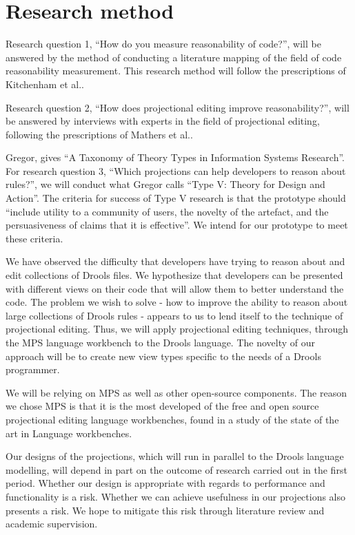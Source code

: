 \section{Research method} 

Research question 1, ``How do you measure reasonability of code?'', will be answered by the method of conducting a literature mapping of the field of code reasonability measurement. 
This research method will follow the prescriptions of Kitchenham et al.\cite{kitchenham2015evidence}.

Research question 2, ``How does projectional editing improve reasonability?'', will be answered by interviews with experts in the field of projectional editing, following the prescriptions of Mathers et al.\cite{mathers1998using}.

Gregor\cite{gregor2006nature}, gives ``A Taxonomy of Theory Types in Information Systems Research''. 
For research question 3, ``Which projections can help developers to reason about rules?'', we will conduct what Gregor calls ``Type V: Theory for Design and Action''. 
The criteria for success of Type V research is that the prototype should ``include utility to a community of users, the novelty of the artefact, and the persuasiveness of claims that it is effective''.
We intend for our prototype to meet these criteria.

We have observed the difficulty that developers have trying to reason about and edit collections of Drools files.
We hypothesize that developers can be presented with different views on their code that will allow them to better understand the code.
The problem we wish to solve - how to improve the ability to reason about large collections of Drools rules - appears to us to lend itself to the technique of projectional editing.
Thus, we will apply projectional editing techniques, through the MPS language workbench to the Drools language.
The novelty of our approach will be to create new view types specific to the needs of a Drools programmer.

We will be relying on MPS as well as other open-source components.
The reason we chose MPS is that it is the most developed of the free and open source projectional editing language workbenches, found in a study of the state of the art in Language workbenches\cite{erdweg2013state}.

Our designs of the projections, which will run in parallel to the Drools language modelling, will depend in part on the outcome of research carried out in the first period.
Whether our design is appropriate with regards to performance and functionality is a risk. 
Whether we can achieve usefulness in our projections also presents a risk.
We hope to mitigate this risk through literature review and academic supervision.

